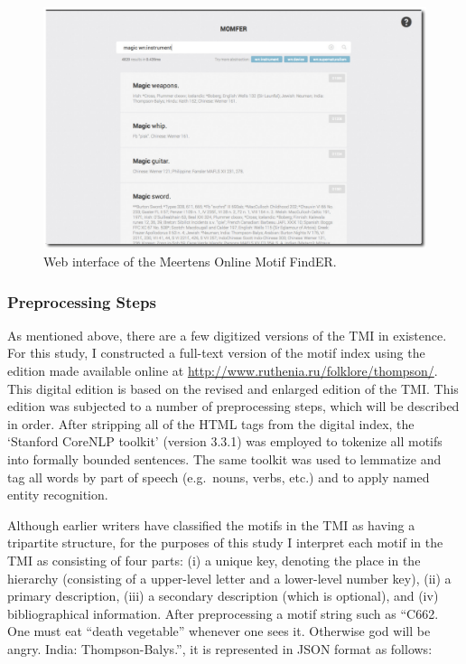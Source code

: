 \begin{figure}
    \centering
    \includegraphics[width=\textwidth]{images/momfer.pdf}
    \caption{Web interface of the Meertens Online Motif FindER.}
\label{fig:momfer}
\end{figure}

\subsubsection{Preprocessing Steps}
As mentioned above, there are a few digitized versions of the TMI in existence. For this study, I constructed a full-text version of the motif index using the edition made available online at \url{http://www.ruthenia.ru/folklore/thompson/}. This digital edition is based on the revised and enlarged edition of the TMI\autocite{thompson:1955}. This edition was subjected to a number of preprocessing steps, which will be described in order. After stripping all of the HTML tags from the digital index, the `Stanford CoreNLP toolkit' (version 3.3.1)\autocite{toutanova:2003} was employed to tokenize all motifs into formally bounded sentences. The same toolkit was used to lemmatize and tag all words by part of speech (e.g.\ nouns, verbs, etc.) and to apply named entity recognition.

Although earlier writers have classified the motifs in the TMI as having a tripartite structure\autocite[Notably][]{el-shamy:1995}, for the purposes of this study I interpret each motif in the TMI as consisting of four parts: (i) a unique key, denoting the place in the hierarchy (consisting of a upper-level letter and a lower-level number key), (ii) a primary description, (iii) a secondary description (which is optional), and (iv) bibliographical information. After preprocessing a motif string such as ``C662. One must eat ``death vegetable'' whenever one sees it. Otherwise god will be angry. India: Thompson-Balys.'', it is represented in JSON format as follows:

